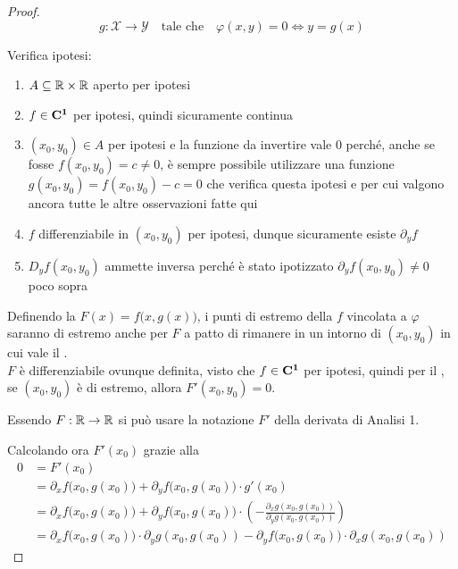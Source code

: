 \begin{theorem}[dei Moltiplicatori di Lagrange - $n=2$, $m=1$]
\begin{proof}
		\[g: \mathcal{X} \to \mathcal{Y} \quad \text{tale che} \quad \varphi(x,y) = 0 \iff y = g(x)\]
		\vspace*{-\baselineskip}
		\begin{note}
			Verifica ipotesi:
			\begin{enumerate}
				\item $A \subseteq \mathbb{R} \times \mathbb{R}$ aperto per ipotesi
				\item $f \in \mathbf{C^{1}}$ per ipotesi, quindi sicuramente continua
				\item $(x_0, y_0) \in A$ per ipotesi e la funzione da invertire vale $0$ perché, anche se fosse $f(x_0, y_0) = c \neq 0$, è sempre possibile utilizzare una funzione $g(x_0, y_0) = f(x_0, y_0) - c = 0$ che verifica questa ipotesi e per cui valgono ancora tutte le altre osservazioni fatte qui
				\item $f$ differenziabile in $(x_0, y_0)$ per ipotesi, dunque sicuramente esiste $\partial_y f$
				\item $D_yf(x_0, y_0)$ ammette inversa perché è stato ipotizzato $\partial_y f(x_0,y_0) \neq 0$ poco sopra
			\end{enumerate}
		\end{note}
		Definendo la $F(x) = f \bigl( x, g(x) \bigr)$, i punti di estremo della $f$ vincolata a $\varphi$ saranno di estremo anche per $F$ a patto di rimanere in un intorno di $(x_0, y_0)$ in cui vale il .\\
		$F$ è differenziabile ovunque definita, visto che $f \in \mathbf{C^{1}}$ per ipotesi, quindi per il , se $(x_0, y_0)$ è di estremo, allora $F'(x_0, y_0) = 0$.
		\begin{note}
			Essendo $F: \mathbb{R} \to \mathbb{R}$ si può usare la notazione $F'$ della derivata di Analisi 1.
		\end{note}
		Calcolando ora $F'(x_0)$ grazie alla 
		\begin{align*}
			0
			&= F'(x_0)\\
			&=	\partial_x f\bigl( x_0, g(x_0) \bigr) +
				\partial_y f\bigl( x_0, g(x_0) \bigr) \cdot
				g'(x_0)\\
			&=	\partial_x f\bigl( x_0, g(x_0) \bigr) +
				\partial_y f\bigl( x_0, g(x_0) \bigr) \cdot
				\left(
					-
					\frac{
						\partial_x g(x_0,g(x_0))
					}{
						\partial_y g(x_0,g(x_0))
					}
				\right)\\
			&=	\partial_x f\bigl( x_0, g(x_0) \bigr) \cdot \partial_y g(x_0,g(x_0)) -
				\partial_y f\bigl( x_0, g(x_0) \bigr) \cdot \partial_x g(x_0,g(x_0))

\end{align*}
\end{proof}
\end{theorem}
